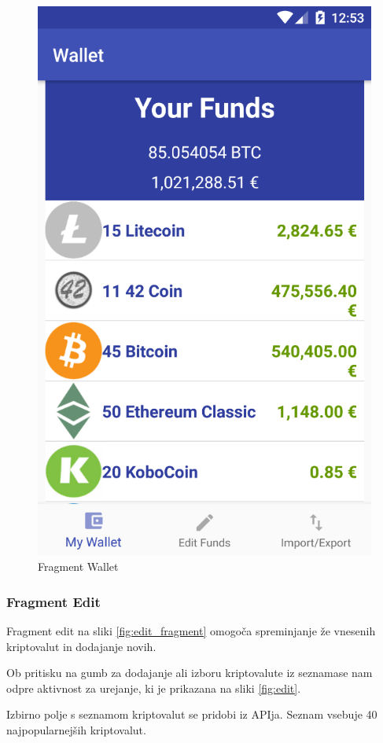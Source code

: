 \documentclass[11pt,a4paper]{article}
\begin{document}
\begin{figure}[htb]
	\begin{center}
		\includegraphics[width=0.8\columnwidth]{wallet.png}
	\end{center}
	\caption{Fragment Wallet}
	\label{fig:wallet}
\end{figure}

\subsubsection{Fragment Edit}
Fragment edit na sliki \ref{fig:edit_fragment} omogoča spreminjanje že vnesenih kriptovalut in dodajanje novih.

Ob pritisku na gumb za dodajanje ali izboru kriptovalute iz seznamase nam odpre 
aktivnost za urejanje, ki je prikazana na sliki \ref{fig:edit}.

Izbirno polje s seznamom kriptovalut se pridobi iz APIja. Seznam vsebuje
40 najpopularnejših kriptovalut. 
\end{document}
